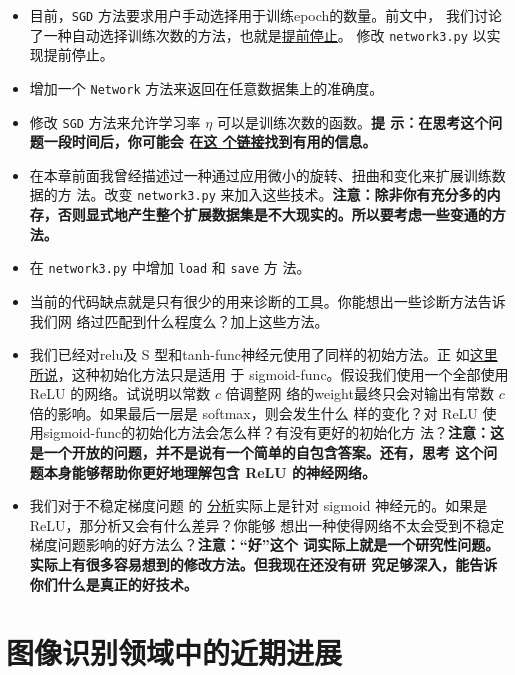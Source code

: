 \begin{itemize}
\item 目前，\lstinline!SGD! 方法要求用户手动选择用于训练\gls*{epoch}的数量。前文中，
  我们讨论了一种自动选择训练次数的方法，也就是\hyperref[early_stopping]{提前停止}。
  修改 \lstinline!network3.py! 以实现提前停止。
\item 增加一个 \lstinline!Network! 方法来返回在任意数据集上的准确度。
\item 修改 \lstinline!SGD! 方法来允许学习率 $\eta$ 可以是训练次数的函数。\textbf{提
    示：在思考这个问题一段时间后，你可能会
    在\href{https://groups.google.com/forum/\#!topic/theano-users/NQ9NYLvleGc}{这
      个链接}找到有用的信息。}
\item 在本章前面我曾经描述过一种通过应用微小的旋转、扭曲和变化来扩展训练数据的方
  法。改变 \lstinline!network3.py! 来加入这些技术。\textbf{注意：除非你有充分多的内
    存，否则显式地产生整个扩展数据集是不大现实的。所以要考虑一些变通的方法。}
\item 在 \lstinline!network3.py! 中增加 \lstinline!load! 和 \lstinline!save! 方
  法。
\item 当前的代码缺点就是只有很少的用来诊断的工具。你能想出一些诊断方法告诉我们网
  络过匹配到什么程度么？加上这些方法。
\item 我们已经对\gls*{relu}及 S 型和\gls*{tanh-func}神经元使用了同样的初始方法。正
  如\hyperref[sec:weight_initialization]{这里所说}，这种初始化方法只是适用
  于 \gls*{sigmoid-func}。假设我们使用一个全部使用 ReLU 的网络。试说明以常数 $c$ 倍调整网
  络的\gls*{weight}最终只会对输出有常数 $c$ 倍的影响。如果最后一层是 softmax，则会发生什么
  样的变化？对 ReLU 使用\gls*{sigmoid-func}的初始化方法会怎么样？有没有更好的初始化方
  法？\textbf{注意：这是一个开放的问题，并不是说有一个简单的自包含答案。还有，思考
    这个问题本身能够帮助你更好地理解包含 ReLU 的神经网络。}
\item 我们对于不稳定梯度问题
  的%
  \hyperref[sec:what_is_causing_the_vanishing_gradient_problem_unstable_gradients_in_deep_neural_nets]{%
    分析}实际上是针对 sigmoid 神经元的。如果是 ReLU，那分析又会有什么差异？你能够
  想出一种使得网络不太会受到不稳定梯度问题影响的好方法么？\textbf{注意：“好”这个
    词实际上就是一个研究性问题。实际上有很多容易想到的修改方法。但我现在还没有研
    究足够深入，能告诉你们什么是真正的好技术。}
\end{itemize}

\section{图像识别领域中的近期进展}
\label{sec:recent_progress_in_image_recognition}

